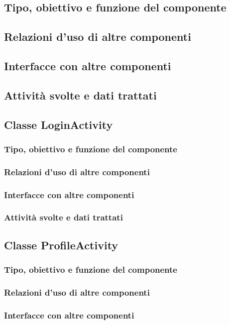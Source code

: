 \subsection*{Tipo, obiettivo e funzione del componente}
\subsection*{Relazioni d'uso di altre componenti}
\subsection*{Interfacce con altre componenti}
\subsection*{Attivit\`a svolte e dati trattati}

\subsection{Classe LoginActivity}
\subsubsection*{Tipo, obiettivo e funzione del componente}
\subsubsection*{Relazioni d'uso di altre componenti}
\subsubsection*{Interfacce con altre componenti}
\subsubsection*{Attivit\`a svolte e dati trattati}

\subsection{Classe ProfileActivity}
\subsubsection*{Tipo, obiettivo e funzione del componente}
\subsubsection*{Relazioni d'uso di altre componenti}
\subsubsection*{Interfacce con altre componenti}

